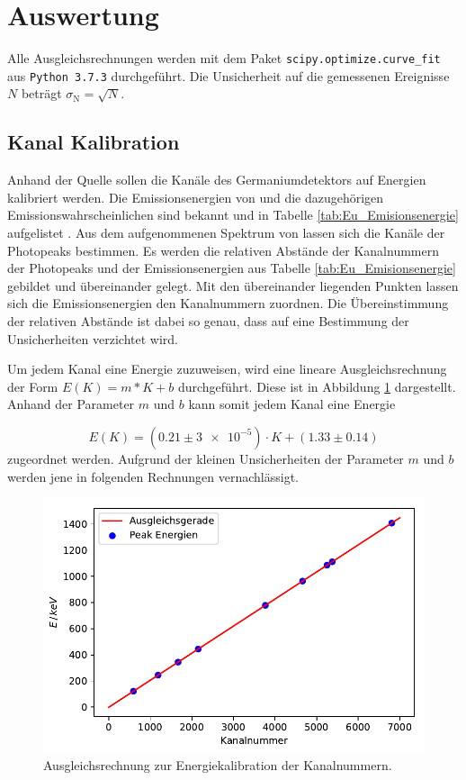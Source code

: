 \section{Auswertung}

Alle Ausgleichsrechnungen werden mit dem Paket \texttt{scipy.optimize.curve\_fit}  aus \texttt{Python 3.7.3} durchgeführt.
Die Unsicherheit auf die gemessenen Ereignisse $N$ beträgt $\sigma_\text{N} = \sqrt{N}$.

\subsection{Kanal Kalibration}

Anhand der  Quelle sollen die Kanäle des Germaniumdetektors auf Energien kalibriert werden.
Die Emissionsenergien von  und die dazugehörigen Emissionswahrscheinlichen sind bekannt und in Tabelle \ref{tab:Eu_Emisionsenergie} aufgelistet \cite{Eu_Emision}.
Aus dem aufgenommenen Spektrum von  lassen sich die Kanäle der Photopeaks bestimmen.
Es werden die relativen Abstände der Kanalnummern der Photopeaks und der Emissionsenergien aus Tabelle \ref{tab:Eu_Emisionsenergie} gebildet und übereinander gelegt.
Mit den übereinander liegenden Punkten lassen sich die Emissionsenergien den Kanalnummern zuordnen.
Die Übereinstimmung der relativen Abstände ist dabei so genau, dass auf eine Bestimmung der Unsicherheiten verzichtet wird.

Um jedem Kanal eine Energie zuzuweisen, wird eine lineare Ausgleichsrechnung der Form $E(K) = m*K+b$ durchgeführt.
Diese ist in Abbildung \ref{fig:Channel_Kalibration} dargestellt.
Anhand der Parameter $m$ und $b$ kann somit jedem Kanal eine Energie

\begin{equation}
  E(K) = (0.21 \pm \num{3e-5}) \cdot K + (1.33 \pm 0.14)
  \label{channel_kal}
\end{equation}
zugeordnet werden.
Aufgrund der kleinen Unsicherheiten der Parameter $m$ und $b$ werden jene in folgenden Rechnungen vernachlässigt.

\begin{figure}[H]
  \centering
  \includegraphics[width = .7\textwidth]{../Plots/Channel_Kalibration.pdf}
  \caption{Ausgleichsrechnung zur Energiekalibration der Kanalnummern. }
  \label{fig:Channel_Kalibration}
\end{figure}

